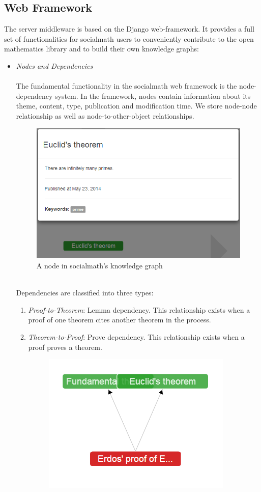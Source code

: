\documentclass{acm_proc_article-sp}
\begin{document}
\subsection{Web Framework}
The server middleware is based on the Django web-framework. It provides a full set of functionalities for socialmath users to conveniently contribute to the open mathematics library and to build their own knowledge graphs:
\begin{itemize}

\item \emph{Nodes and Dependencies} \\\\
The fundamental functionality in the socialmath web framework is the node-dependency system. In the framework, nodes contain information about its theme, content, type, publication and modification time. We store node-node relationship as well as node-to-other-object relationships. \\
\begin{figure}[h!]
\centering
\includegraphics[scale=0.37]{oneNode.png}
\caption{A node in socialmath's knowledge graph}
\end{figure}\\
Dependencies are classified into three types:
\begin{enumerate}
\item \emph{Proof-to-Theorem}: Lemma dependency. This relationship exists when a proof of one theorem cites another theorem in the process. 
\item \emph{Theorem-to-Proof}: Prove dependency. This relationship exists when a proof proves a theorem. 
\begin{figure}[h!]
\centering
\includegraphics[scale=0.3]{prove_lemma_relationship.png}

\end{figure}
\end{enumerate}
\end{itemize}
\end{document}
